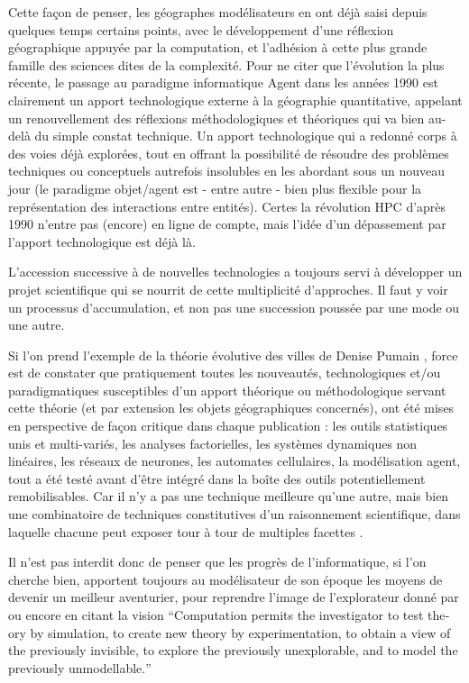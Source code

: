 Cette façon de penser, les géographes modélisateurs en ont déjà saisi depuis quelques temps certains points, avec le développement d'une réflexion géographique appuyée par la computation, et l'adhésion à cette plus grande famille des sciences dites de la complexité. Pour ne citer que l'évolution la plus récente, le passage au paradigme informatique Agent dans les années 1990 est clairement un apport technologique externe à la géographie quantitative, appelant un renouvellement des réflexions méthodologiques et théoriques \autocite{Sanders2006} qui va bien au-delà du simple constat technique. Un apport technologique qui a redonné corps à des voies déjà explorées, tout en offrant la possibilité de résoudre des problèmes techniques ou conceptuels autrefois insolubles en les abordant sous un nouveau jour (le paradigme objet/agent est - entre autre - bien plus flexible pour la représentation des interactions entre entités). Certes la révolution HPC d'après 1990 n'entre pas (encore) en ligne de compte, mais l'idée d'un dépassement par l'apport technologique est déjà là.

L'accession successive à de nouvelles technologies a toujours servi à développer un projet scientifique qui se nourrit de cette multiplicité d'approches. Il faut y voir un processus d'accumulation, et non pas une succession poussée par une mode ou une autre.

Si l'on prend l'exemple de la théorie évolutive des villes de Denise Pumain \autocite{Pumain1997}, force est de constater que pratiquement toutes les nouveautés, technologiques et/ou paradigmatiques susceptibles d'un apport théorique ou méthodologique servant cette théorie (et par extension les objets géographiques concernés), ont été mises en perspective de façon critique dans chaque publication : les outils statistiques unis et multi-variés, les analyses factorielles, les systèmes dynamiques non linéaires, les réseaux de neurones, les automates cellulaires, la modélisation agent, tout a été testé avant d'être intégré dans la boîte des outils potentiellement remobilisables. Car il n'y a pas une technique meilleure qu'une autre, mais bien une combinatoire de techniques constitutives d'un raisonnement scientifique, dans laquelle chacune peut exposer tour à tour de multiples facettes \autocite{Sanders2000, Mathian2014}.

Il n'est pas interdit donc de penser que les progrès de l'informatique, si l'on cherche bien, apportent toujours au modélisateur de son époque les moyens de devenir un meilleur aventurier, pour reprendre l'image de l'explorateur donné par \textcite[22]{Banos2013} ou encore en citant la vision \textcite[1]{Openshaw2000b} \foreignquote{english}{Computation permits the investigator to test theory by simulation, to create new theory by experimentation, to obtain a view of the previously invisible, to explore the previously unexplorable, and to model the previously unmodellable.}

